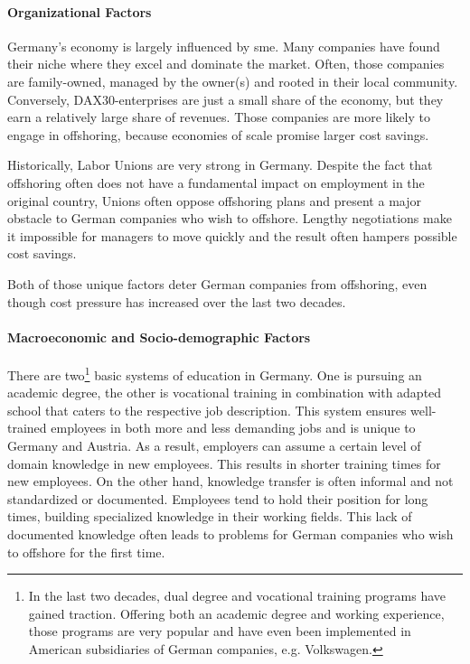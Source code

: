 \paragraph{Organizational Factors}
Germany's economy is largely influenced by \gls{sme}. Many companies have found their niche where they excel and dominate the market. Often, those companies are family-owned, managed by the owner(s) and rooted in their local community. %
Conversely, DAX30-enterprises are just a small share of the economy, but they earn a relatively large share of revenues. Those companies are more likely to engage in offshoring, because economies of scale promise larger cost savings.

Historically, Labor Unions are very strong in Germany. Despite the fact that offshoring often does not have a fundamental impact on employment in the original country, Unions often oppose offshoring plans and present a major obstacle to German companies who wish to offshore. Lengthy negotiations make it impossible for managers to move quickly and the result often hampers possible cost savings.

Both of those unique factors deter German companies from offshoring, even though cost pressure has increased over the last two decades.

\paragraph{Macroeconomic and Socio-demographic Factors}
There are two\footnote{In the last two decades, dual degree and vocational training programs have gained traction. Offering both an academic degree and working experience, those programs are very popular and have even been implemented in American subsidiaries of German companies, e.g. Volkswagen.} basic systems of education in Germany. One is pursuing an academic degree, the other is vocational training in combination with adapted school that caters to the respective job description. This system ensures well-trained employees in both more and less demanding jobs and is unique to Germany and Austria. As a result, employers can assume a certain level of domain knowledge in new employees. This results in shorter training times for new employees. On the other hand, knowledge transfer is often informal and not standardized or documented. Employees tend to hold their position for long times, building specialized knowledge in their working fields. This lack of documented knowledge often leads to problems for German companies who wish to offshore for the first time.


